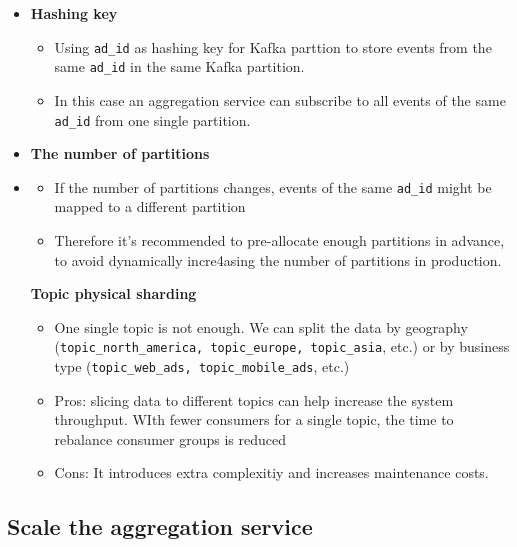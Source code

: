 \documentclass{report}
\theoremstyle{definition}
\let\oldsubsection\subsection
\renewcommand{\subsection}{\oldsubsection*}
\begin{document}
\begin{itemize}
\item
\textbf{Hashing key}

\begin{itemize}
\item

Using \lstinline|ad_id| as hashing key for Kafka parttion to store
events from the same \lstinline|ad_id| in the same Kafka partition.
\item
In this case an aggregation service can subscribe to all events of the same \lstinline|ad_id| from one single partition.
\end{itemize}

\item
\textbf{The number of partitions}
\item

\begin{itemize}
\item
If the number of partitions changes, events of the same \lstinline|ad_id| might be mapped to a different partition
\item
Therefore it's recommended to pre-allocate enough partitions in advance, to avoid dynamically incre4asing the number of partitions in production.
\end{itemize}

\textbf{Topic physical sharding}

\begin{itemize}
\item
One single topic is not enough. We can split the data by geography (\lstinline|topic_north_america, topic_europe, topic_asia|, etc.) or by business type (\lstinline|topic_web_ads, topic_mobile_ads|, etc.)
\end{itemize}

\begin{itemize}
\item
Pros: slicing data to different topics can help increase the system throughput. WIth fewer consumers for a single topic, the time to rebalance consumer groups is reduced
\item
Cons: It introduces extra complexitiy and increases maintenance costs.
\end{itemize}
\end{itemize}

\subsection{Scale the aggregation service}
\end{document}
